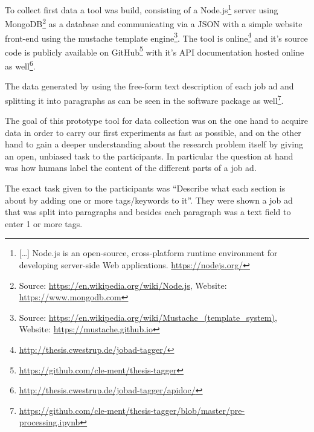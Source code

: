 To collect first data a tool was build, consisting of a Node.js\footnote{[\ldots] Node.js is an open-source, cross-platform runtime environment for developing server-side Web applications. \url{https://nodejs.org/}} server using MongoDB\footnote{ Source: \url{https://en.wikipedia.org/wiki/Node.js}, Website: \url{https://www.mongodb.com}} as a database and communicating via a JSON with a simple website front-end using the mustache template engine\footnote{ Source: \url{https://en.wikipedia.org/wiki/Mustache_(template_system)}, Website: \url{https://mustache.github.io}}.
The tool is online\footnote{\url{http://thesis.cwestrup.de/jobad-tagger/}} and it's source code is publicly available on GitHub\footnote{\url{https://github.com/cle-ment/thesis-tagger}} with it's API documentation hosted online as well\footnote{\url{http://thesis.cwestrup.de/jobad-tagger/apidoc/}}.

The data generated by using the free-form text description of each job ad and splitting it into paragraphs as can be seen in the software package as well\footnote{\url{https://github.com/cle-ment/thesis-tagger/blob/master/pre-processing.ipynb}}.

The goal of this prototype tool for data collection was on the one hand to acquire data in order to carry our first experiments as fast as possible, and on the other hand to gain a deeper understanding about the research problem itself by giving an open, unbiased task to the participants. In particular the question at hand was how humans label the content of the different parts of a job ad.

The exact task given to the participants was ``Describe what each section is about by adding one or more tags/keywords to it''. They were shown a job ad that was split into paragraphs and besides each paragraph was a text field to enter 1 or more tags.

